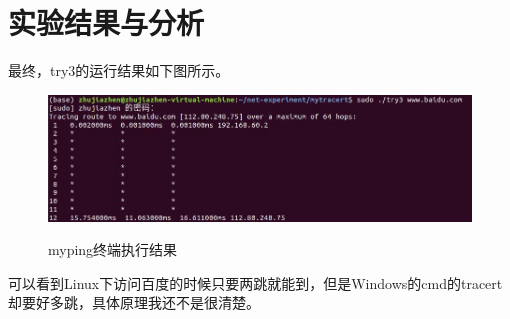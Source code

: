 \documentclass[12pt]{ctexart}
\begin{document}
    \section{实验结果与分析}

    最终，try3的运行结果如下图所示。

    \begin{figure}[H]
        \centering
        \includegraphics[width=5in]{figures/res.jpg}
        \label{rw}
        \caption{myping终端执行结果}
    \end{figure}
    
    可以看到Linux下访问百度的时候只要两跳就能到，但是Windows的cmd的tracert却要好多跳，具体原理我还不是很清楚。
    
\end{document}
